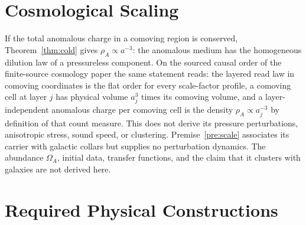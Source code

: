 \documentclass[11pt]{article}
\begin{document}
\section{Cosmological Scaling}
\label{sec:cosmo}

If the total anomalous charge in a comoving region is conserved,
Theorem~\ref{thm:cold} gives \(\rho_A\propto a^{-3}\): the anomalous medium
has the homogeneous dilution law of a pressureless component. On the
sourced causal order of the finite-source cosmology paper the same statement
reads: the layered read law in comoving coordinates is the flat order for
every scale-factor profile, a comoving cell at layer \(j\) has physical
volume \(a_j^3\) times its comoving volume, and a layer-independent
anomalous charge per comoving cell is the density \(\rho_A\propto a_j^{-3}\)
by definition of that count measure. This does not
derive its pressure perturbations, anisotropic stress, sound speed, or
clustering. Premise~\ref{pre:scale} associates its carrier with galactic
collars but supplies no perturbation dynamics. The abundance \(\Omega_A\),
initial data, transfer functions, and the claim that it clusters with galaxies are not derived here.

\section{Required Physical Constructions}
\label{sec:open}
\end{document}
